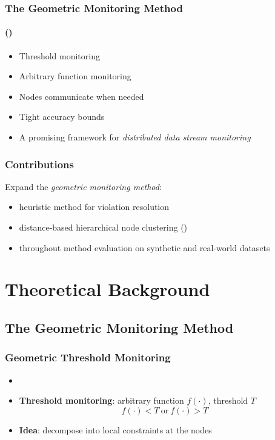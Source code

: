 \documentclass[hyperref={pdfpagelabels=false}]{beamer}
\begin{document}
\begin{frame} \frametitle{The Geometric Monitoring Method}\framesubtitle{\tiny()}
\begin{itemize}
\item Threshold monitoring
\item Arbitrary function monitoring
\item Nodes communicate when needed
\item Tight accuracy bounds
\item A promising framework for \emph{distributed data stream monitoring}
\end{itemize}
\end{frame}

\begin{frame} \frametitle{Contributions}
Expand the \emph{geometric monitoring method}:
\begin{itemize}
\item<1-> heuristic method for violation resolution
\item<2-> distance-based hierarchical node clustering \tiny()
\item<3-> throughout method evaluation on synthetic and real-world datasets
\end{itemize}
\end{frame}

\section{Theoretical Background}
\begin{frame}
  \tableofcontents[currentsection]
 \end{frame}
\subsection{The Geometric Monitoring Method}
\begin{frame} \frametitle{Geometric Threshold Monitoring}
\begin{itemize}
\item {}
\item \textbf{Threshold monitoring}: arbitrary function $f(\cdot)$, threshold $T$\\
 $$f(\cdot)<T\ \text{or}\ f(\cdot)>T$$
\item \textbf{Idea}: decompose into local constraints at the nodes
\end{itemize}
\end{frame}
\end{document}
